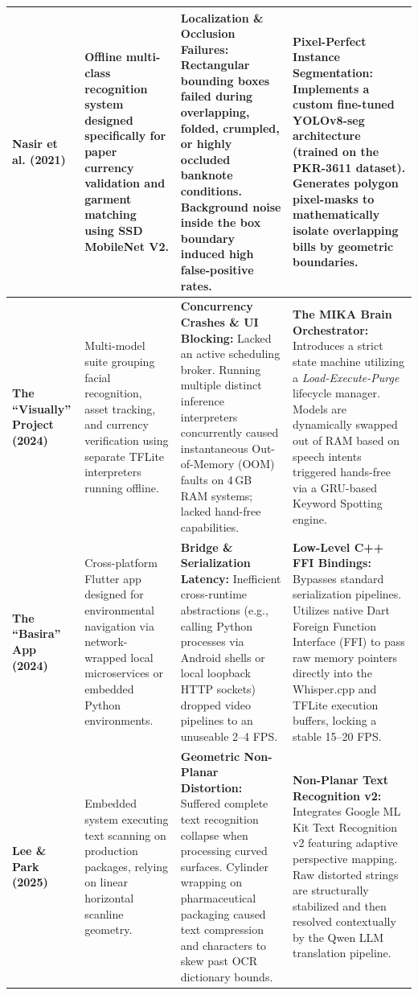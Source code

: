 \documentclass[12pt,a4paper]{report}
\begin{document}
{\begin{xltabular}{\textwidth}{|>{\raggedright\arraybackslash}p{2.2cm}|>{\raggedright\arraybackslash}p{3.2cm}|X|X|}
        \textbf{Nasir et al. (2021)} & 
        Offline multi-class recognition system designed specifically for paper currency validation and garment matching using SSD MobileNet V2. & 
        \textbf{Localization \& Occlusion Failures:} Rectangular bounding boxes failed during overlapping, folded, crumpled, or highly occluded banknote conditions. Background noise inside the box boundary induced high false-positive rates. & 
        \textbf{Pixel-Perfect Instance Segmentation:} Implements a custom fine-tuned YOLOv8-seg architecture (trained on the PKR-3611 dataset). Generates polygon pixel-masks to mathematically isolate overlapping bills by geometric boundaries. \\ \hline
        
        \textbf{The ``Visually'' Project (2024)} & 
        Multi-model suite grouping facial recognition, asset tracking, and currency verification using separate TFLite interpreters running offline. & 
        \textbf{Concurrency Crashes \& UI Blocking:} Lacked an active scheduling broker. Running multiple distinct inference interpreters concurrently caused instantaneous Out-of-Memory (OOM) faults on 4\,GB RAM systems; lacked hand-free capabilities. & 
        \textbf{The MIKA Brain Orchestrator:} Introduces a strict state machine utilizing a \textit{Load-Execute-Purge} lifecycle manager. Models are dynamically swapped out of RAM based on speech intents triggered hands-free via a GRU-based Keyword Spotting engine. \\ \hline
        
        \textbf{The ``Basira'' App (2024)} & 
        Cross-platform Flutter app designed for environmental navigation via network-wrapped local microservices or embedded Python environments. & 
        \textbf{Bridge \& Serialization Latency:} Inefficient cross-runtime abstractions (e.g., calling Python processes via Android shells or local loopback HTTP sockets) dropped video pipelines to an unuseable 2--4 FPS. & 
        \textbf{Low-Level C++ FFI Bindings:} Bypasses standard serialization pipelines. Utilizes native Dart Foreign Function Interface (FFI) to pass raw memory pointers directly into the Whisper.cpp and TFLite execution buffers, locking a stable 15--20 FPS. \\ \hline
        
        \textbf{Lee \& Park (2025)} & 
        Embedded system executing text scanning on production packages, relying on linear horizontal scanline geometry. & 
        \textbf{Geometric Non-Planar Distortion:} Suffered complete text recognition collapse when processing curved surfaces. Cylinder wrapping on pharmaceutical packaging caused text compression and characters to skew past OCR dictionary bounds. & 
        \textbf{Non-Planar Text Recognition v2:} Integrates Google ML Kit Text Recognition v2 featuring adaptive perspective mapping. Raw distorted strings are structurally stabilized and then resolved contextually by the Qwen LLM translation pipeline. \\ \hline
        

\end{xltabular}}
\end{document}
